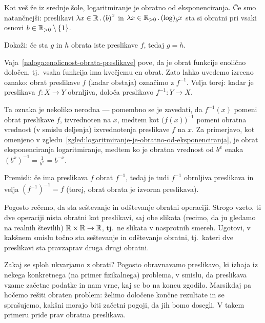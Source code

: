 \begin{zgled}\label{zgled:logaritmiranje-je-obratno-od-eksponenciranja}
Kot veš že iz srednje šole, logaritmiranje je obratno od eksponenciranja. Če smo natančnejši: preslikavi $\lam{x \in \RR}  b^x$ in $\lam{x \in \RR_{>0}} \log_b x$ sta si obratni pri vsaki osnovi $b \in \RR_{> 0} \setminus \set{1}$.
\end{zgled}

\begin{naloga}\label{naloga:enolicnost-obrata-preslikave}
Dokaži: če sta $g$ in $h$ obrata iste preslikave $f$, tedaj $g = h$.
\end{naloga}

Vaja~\ref{naloga:enolicnost-obrata-preslikave} pove, da je obrat funkcije enolično določen, tj.~vsaka funkcija ima kvečjemu en obrat. Zato lahko uvedemo izrecno oznako: obrat preslikave $f$ (kadar obstaja) označimo z $f^{-1}$. Velja torej: kadar je preslikava $f\colon X \to Y$ obrnljiva, določa preslikavo $f^{-1}\colon Y \to X$.

Ta oznaka je nekoliko nerodna --- pomembno se je zavedati, da $f^{-1}(x)$ pomeni obrat preslikave $f$, izvrednoten na $x$, medtem kot $\big(f(x)\big)^{-1}$ pomeni obratna vrednost (v smislu deljenja) izvrednotenja preslikave $f$ na $x$. Za primerjavo, kot omenjeno v zgledu~\ref{zgled:logaritmiranje-je-obratno-od-eksponenciranja}, je obrat eksponenciranja logaritmiranje, medtem ko je obratna vrednost od $b^x$ enaka $(b^x)^{-1} = \frac{1}{b^x} = b^{-x}$.

\begin{naloga}
Premisli: če ima preslikava $f$ obrat $f^{-1}$, tedaj je tudi $f^{-1}$ obrnljiva preslikava in velja $(f^{-1})^{-1} = f$ (torej, obrat obrata je izvorna preslikava).
\end{naloga}

\begin{naloga}
Pogosto rečemo, da sta seštevanje in odštevanje obratni operaciji. Strogo vzeto, ti dve operaciji nista obratni kot preslikavi, saj obe slikata (recimo, da ju gledamo na realnih številih) $\mathbb{R} \times \mathbb{R} \to \mathbb{R}$, tj.~ne slikata v nasprotnih smereh. Ugotovi, v kakšnem smislu točno sta seštevanje in odštevanje obratni, tj.~kateri dve preslikavi sta pravzaprav druga drugi obratni.
\end{naloga}

Zakaj se sploh ukvarjamo z obrati? Pogosto obravnavamo preslikavo, ki izhaja iz nekega konkretnega (na primer fizikalnega) problema, v smislu, da preslikava vzame začetne podatke in nam vrne, kaj se bo na koncu zgodilo. Marsikdaj pa hočemo rešiti obraten problem: želimo določene končne rezultate in se sprašujemo, kakšni morajo biti začetni pogoji, da jih bomo dosegli. V takem primeru pride prav obratna preslikava.

